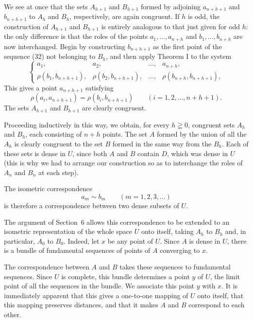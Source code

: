 \documentclass[a4paper,12pt]{amsart}
\newcommand{\srcpage}[1]{} %
\begin{document}
We see at once that the sets $A_{h+1}$ and $B_{h+1}$ formed by adjoining $a_{n+h+1}$ and $b_{n+h+1}$ to $A_h$ and $B_h$, respectively, are again congruent. If $h$ is odd, the construction of $A_{h+1}$ and $B_{h+1}$ is entirely analogous to that just given for odd $h$: the only difference is that the roles of the points $a_1,\dots,a_{n+h}$ and $b_1,\dots,b_{n+h}$ are now interchanged. Begin by constructing $b_{n+h+1}$ as the first point of the sequence (32) not belonging to $B_h$, and then apply Theorem I to the system
\begin{equation}\tag{33 b}
\left\{\begin{array}{cccc}
a_1,&a_2,&\dots,&a_{n+h},\\
\rho(b_1,b_{n+h+1}),&\rho(b_2,b_{n+h+1}),&\dots,&\rho(b_{n+h},b_{n+h+1}),
\end{array}\right.
\end{equation}
This gives a point $a_{n+h+1}$ satisfying
\[
\rho(a_i,a_{n+h+1})=\rho(b_i,b_{n+h+1})\qquad(i=1,2,\dots,n+h+1).
\]
The sets $A_{h+1}$ and $B_{h+1}$ are clearly congruent.
\srcpage{76}
Proceeding inductively in this way, we obtain, for every $h\geqq0$, congruent sets $A_h$ and $B_h$, each consisting of $n+h$ points. The set $A$ formed by the union of all the $A_h$ is clearly congruent to the set $B$ formed in the same way from the $B_h$. Each of these sets is dense in $U$, since both $A$ and $B$ contain $D$, which was dense in $U$ (this is why we had to arrange our construction so as to interchange the roles of $A_n$ and $B_n$ at each step).

The isometric correspondence
\begin{equation}\tag{34}
a_m\sim b_m\qquad(m=1,2,3,\dots)
\end{equation}
is therefore a correspondence between two dense subsets of $U$.

The argument of Section~6 allows this correspondence to be extended to an isometric representation of the whole space $U$ onto itself, taking $A_h$ to $B_h$ and, in particular, $A_0$ to $B_0$. Indeed, let $x$ be any point of $U$. Since $A$ is dense in $U$, there is a bundle of fundamental sequences of points of $A$ converging to $x$.

The correspondence between $A$ and $B$ takes these sequences to fundamental sequences. Since $U$ is complete, this bundle determines a point $y$ of $U$, the limit point of all the sequences in the bundle. We associate this point $y$ with $x$. It is immediately apparent that this gives a one-to-one mapping of $U$ onto itself, that this mapping preserves distances, and that it makes $A$ and $B$ correspond to each other.
\end{document}
